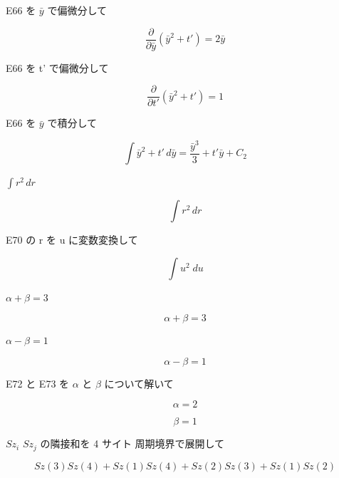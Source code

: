 \documentclass[dvipdfmx,a4paper,11pt]{jsarticle}
\begin{document}
E66 を $\bar{y}$ で偏微分して

\begin{equation}
  \frac{\partial}{\partial \bar{y}}\left(\bar{y}^2 + t'\right) = 2 \bar{y}
  \label{eq:E67}
\end{equation}

E66 を t' で偏微分して

\begin{equation}
  \frac{\partial}{\partial t'}\left(\bar{y}^2 + t'\right) = 1
  \label{eq:E68}
\end{equation}

E66 を $\bar{y}$ で積分して

\begin{equation}
  \int \bar{y}^2 + t' \, d\bar{y} = \frac{\bar{y}^3}{3}+t' \bar{y} + C_2
  \label{eq:E69}
\end{equation}

$\int r^2 \, dr$

\begin{equation}
  \int r^2 \, dr
  \label{eq:E70}
\end{equation}

E70 の r を u に変数変換して

\begin{equation}
  \int {u^2}{\;du}
  \label{eq:E71}
\end{equation}

$\alpha + \beta = 3$

\begin{equation}
  \alpha + \beta = 3
  \label{eq:E72}
\end{equation}

$\alpha - \beta = 1$

\begin{equation}
  \alpha - \beta = 1
  \label{eq:E73}
\end{equation}

E72 と E73 を $\alpha$ と $\beta$ について解いて

\begin{equation}
  \alpha = 2
  \label{eq:E74}
\end{equation}

\begin{equation}
  \beta = 1
  \label{eq:E75}
\end{equation}

$Sz_i$ $Sz_j$ の隣接和を 4 サイト 周期境界で展開して

\begin{equation}
  Sz\left(3\right) Sz\left(4\right)+Sz\left(1\right) Sz\left(4\right)+Sz\left(2\right) Sz\left(3\right)+Sz\left(1\right) Sz\left(2\right)
  \label{eq:E76}
\end{equation}
\end{document}
